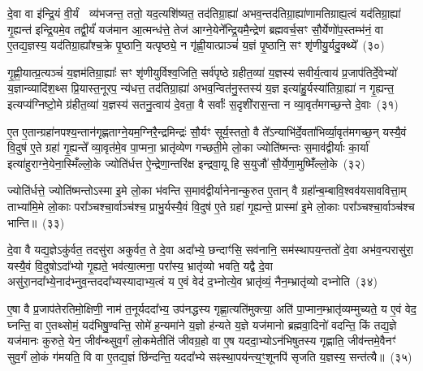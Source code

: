 {\anuvakamend[{अव॑ दाधार मि॒त्रेणै॒व प्री॑णाति॒ षट्च॑}]}%

दे॒वा वा इ॑न्द्रि॒यं वी॒र्यं  व्य॑भजन्त॒ ततो॒ यद॒त्यशि॑ष्यत॒ तद॑तिग्रा॒ह्या॑ अभव॒न्तद॑तिग्रा॒ह्या॑णामतिग्राह्य॒त्वं यद॑तिग्रा॒ह्या॑ गृ॒ह्यन्त॑ इन्द्रि॒यमे॒व तद्वी॒र्यं॑ यज॑मान आ॒त्मन्ध॑त्ते॒ तेज॑ आग्ने॒येने᳚न्द्रि॒यमै॒न्द्रेण॑ ब्रह्मवर्च॒सꣳ सौ॒र्येणो॑प॒स्तम्भ॑नं॒ वा ए॒तद्य॒ज्ञस्य॒ यद॑तिग्रा॒ह्या᳚श्च॒क्रे पृ॒ष्ठानि॒ यत्पृष्ठ्ये॒ न गृ॑ह्णी॒यात्प्राञ्चं॑ य॒ज्ञं पृ॒ष्ठानि॒ सꣳ शृ॑णीयु॒र्यदु॒क्थ्ये᳚~(३०)

गृ॒ह्णी॒यात्प्र॒त्यञ्चं॑ य॒ज्ञम॑तिग्रा॒ह्याः᳚ सꣳ शृ॑णीयुर्विश्व॒जिति॒ सर्व॑पृष्ठे ग्रहीत॒व्या॑ य॒ज्ञस्य॑ सवीर्य॒त्वाय॑ प्र॒जा\-प॑तिर्दे॒वेभ्यो॑ य॒ज्ञान्व्यादि॑श॒थ्स प्रि॒यास्त॒नूरप॒ न्य॑धत्त॒ तद॑तिग्रा॒ह्या॑ अभव॒न्वित॑नु॒स्तस्य॑ य॒ज्ञ इत्या॑हु॒र्यस्या॑तिग्रा॒ह्या॑ न गृ॒ह्यन्त॒ इत्यप्य॑ग्निष्टो॒मे ग्र॑हीत॒व्या॑ य॒ज्ञस्य॑ सतनु॒त्वाय॑ दे॒वता॒ वै सर्वाः᳚ स॒दृशी॑रास॒न्ता न व्या॒वृत᳚मगच्छ॒न्ते दे॒वाः~(३१)

ए॒त ए॒तान्ग्रहा॑नपश्य॒न्तान॑गृह्णताग्ने॒यम॒ग्निरै॒न्द्रमिन्द्रः॑ सौ॒र्यꣳ सूर्य॒स्ततो॒ वै ते᳚\-ऽन्याभि॑र्दे॒वता॑भिर्व्या॒वृत॑मगच्छ॒न् यस्यै॒वं वि॒दुष॑ ए॒ते ग्रहा॑ गृ॒ह्यन्ते᳚ व्या॒वृत॑मे॒व पा॒प्मना॒ भ्रातृ॑व्येण गच्छती॒मे लो॒का ज्योति॑ष्मन्तः स॒माव॑द्वीर्याः का॒र्या॑ इत्या॑हुराग्ने॒येना॒स्मिँल्लो॒के ज्योति॑र्धत्त ऐ॒न्द्रेणा॒न्तरि॑क्ष इन्द्रवा॒यू हि स॒युजौ॑ सौ॒र्येणा॒मुष्मिँ॑ल्लो॒के~(३२)

ज्योति॑र्धत्ते॒ ज्योति॑ष्मन्तो\-ऽस्मा इ॒मे लो॒का भ॑वन्ति स॒माव॑द्वीर्यानेनान्कुरुत ए॒तान् वै ग्रहा᳚न्ब॒म्बावि॒श्वव॑यसाववित्ता॒म् ताभ्या॑मि॒मे लो॒काः परा᳚ञ्चश्चा॒र्वाञ्च॑श्च॒ प्राभु॒र्यस्यै॒वं वि॒दुष॑ ए॒ते ग्रहा॑ गृ॒ह्यन्ते॒ प्रास्मा॑ इ॒मे लो॒काः परा᳚ञ्चश्चा॒र्वाञ्च॑श्च भान्ति॥~(३३)

{\anuvakamend[{उ॒क्थ्ये॑ दे॒वा अ॒मुष्मिँ॑ल्लो॒क एका॒न्नच॑त्वारि॒ꣳ॒शच्च॑}]}%

दे॒वा वै यद्य॒ज्ञे\-ऽकु॑र्वत॒ तदसु॑रा अकुर्वत॒ ते दे॒वा अदा᳚भ्ये॒ छन्दाꣳ॑सि॒ सव॑नानि॒ सम॑स्थापय॒न्ततो॑ दे॒वा अभ॑व॒न्परासु॑रा॒ यस्यै॒वं वि॒दुषो\-ऽदा᳚भ्यो गृ॒ह्यते॒ भव॑त्या॒त्मना॒ परा᳚स्य॒ भ्रातृ॑व्यो भवति॒ यद्वै दे॒वा असु॑रा॒नदा᳚भ्ये॒ना\-द॑भ्नुव॒न्तददा᳚भ्यस्यादाभ्य॒त्वं य ए॒वं वेद॑ द॒भ्नोत्ये॒व भ्रातृ॑व्यं॒ नैन॒म्भ्रातृ॑व्यो दभ्नोति~(३४)

ए॒षा वै प्र॒जाप॑तेरतिमो॒क्षिणी॒ नाम॑ त॒नूर्यददा᳚भ्य॒ उप॑नद्धस्य गृह्णा॒त्यति॑मुक्त्या॒ अति॑ पा॒प्मान॒म्भ्रातृ॑व्यम्मुच्यते॒ य ए॒वं वेद॒ घ्नन्ति॒ वा ए॒तथ्सोमं॒ यद॑भिषु॒ण्वन्ति॒ सोमे॑ ह॒न्यमा॑ने य॒ज्ञो ह॑न्यते य॒ज्ञे यज॑मानो ब्रह्मवा॒दिनो॑ वदन्ति॒ किं तद्य॒ज्ञे यज॑मानः कुरुते॒ येन॒ जीव᳚न्थ्सुव॒र्गं लो॒कमेतीति॑ जीवग्र॒हो वा ए॒ष यददा॒भ्यो\-ऽन॑भिषुतस्य गृह्णाति॒ जीव॑न्तमे॒वैनꣳ॑ सुव॒र्गं लो॒कं ग॑मयति॒ वि वा ए॒तद्य॒ज्ञं छि॑न्दन्ति॒ यददा᳚भ्ये सꣴस्था॒पय॑न्त्य॒ꣳ॒शूनपि॑ सृजति य॒ज्ञस्य॒ सन्त॑त्यै॥~(३५)

